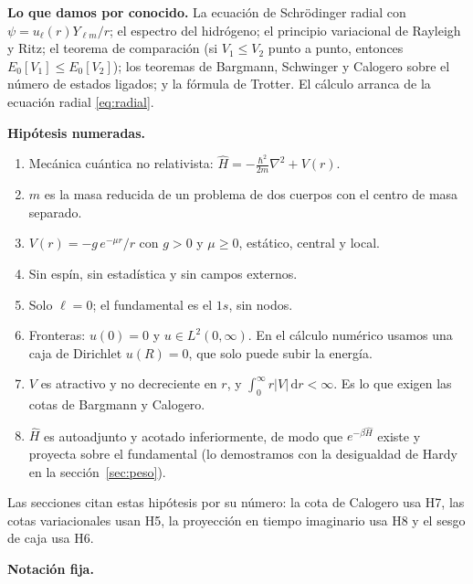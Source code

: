 \documentclass[11pt]{article}
\newcommand{\dd}{\mathrm{d}}
\begin{document}
\textbf{Lo que damos por conocido.} La ecuación de Schrödinger radial con $\psi=u_\ell(r)Y_{\ell m}/r$; el espectro del hidrógeno; el principio variacional de Rayleigh y Ritz; el teorema de comparación (si $V_1\le V_2$ punto a punto, entonces $E_0[V_1]\le E_0[V_2]$); los teoremas de Bargmann, Schwinger y Calogero sobre el número de estados ligados; y la fórmula de Trotter. El cálculo arranca de la ecuación radial \eqref{eq:radial}.

\textbf{Hipótesis numeradas.}
\begin{enumerate}[label=\textbf{H\arabic*.}]
\item Mecánica cuántica no relativista: $\hat H=-\frac{\hbar^2}{2m}\nabla^2+V(r)$.
\item $m$ es la masa reducida de un problema de dos cuerpos con el centro de masa separado.
\item $V(r)=-g\,e^{-\mu r}/r$ con $g>0$ y $\mu\ge0$, estático, central y local.
\item Sin espín, sin estadística y sin campos externos.
\item Solo $\ell=0$; el fundamental es el $1s$, sin nodos.
\item Fronteras: $u(0)=0$ y $u\in L^2(0,\infty)$. En el cálculo numérico usamos una caja de Dirichlet $u(R)=0$, que solo puede subir la energía.
\item $V$ es atractivo y no decreciente en $r$, y $\int_0^\infty r|V|\,\dd r<\infty$. Es lo que exigen las cotas de Bargmann y Calogero.
\item $\hat H$ es autoadjunto y acotado inferiormente, de modo que $e^{-\beta\hat H}$ existe y proyecta sobre el fundamental (lo demostramos con la desigualdad de Hardy en la sección~\ref{sec:peso}).
\end{enumerate}

Las secciones citan estas hipótesis por su número: la cota de Calogero usa H7, las cotas variacionales usan H5, la proyección en tiempo imaginario usa H8 y el sesgo de caja usa H6.

\textbf{Notación fija.}
\end{document}
